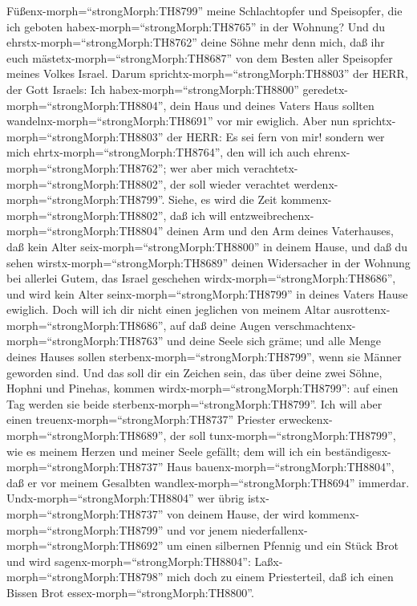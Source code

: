 Füßenx-morph=``strongMorph:TH8799'' meine Schlachtopfer und Speisopfer,
die ich geboten habex-morph=``strongMorph:TH8765'' in der Wohnung? Und
du ehrstx-morph=``strongMorph:TH8762'' deine Söhne mehr denn mich, daß
ihr euch mästetx-morph=``strongMorph:TH8687'' von dem Besten aller
Speisopfer meines Volkes Israel.  Darum
sprichtx-morph=``strongMorph:TH8803'' der HERR, der Gott Israels: Ich
habex-morph=``strongMorph:TH8800''
geredetx-morph=``strongMorph:TH8804'', dein Haus und deines Vaters Haus
sollten wandelnx-morph=``strongMorph:TH8691'' vor mir ewiglich. Aber nun
sprichtx-morph=``strongMorph:TH8803'' der HERR: Es sei fern von mir!
sondern wer mich ehrtx-morph=``strongMorph:TH8764'', den will ich auch
ehrenx-morph=``strongMorph:TH8762''; wer aber mich
verachtetx-morph=``strongMorph:TH8802'', der soll wieder verachtet
werdenx-morph=``strongMorph:TH8799''.  Siehe, es wird die
Zeit kommenx-morph=``strongMorph:TH8802'', daß ich will
entzweibrechenx-morph=``strongMorph:TH8804'' deinen Arm und den Arm
deines Vaterhauses, daß kein Alter seix-morph=``strongMorph:TH8800'' in
deinem Hause,  und daß du sehen
wirstx-morph=``strongMorph:TH8689'' deinen Widersacher in der Wohnung
bei allerlei Gutem, das Israel geschehen
wirdx-morph=``strongMorph:TH8686'', und wird kein Alter
seinx-morph=``strongMorph:TH8799'' in deines Vaters Hause ewiglich.
 Doch will ich dir nicht einen jeglichen von meinem Altar
ausrottenx-morph=``strongMorph:TH8686'', auf daß deine Augen
verschmachtenx-morph=``strongMorph:TH8763'' und deine Seele sich gräme;
und alle Menge deines Hauses sollen
sterbenx-morph=``strongMorph:TH8799'', wenn sie Männer geworden sind.
 Und das soll dir ein Zeichen sein, das über deine zwei
Söhne, Hophni und Pinehas, kommen wirdx-morph=``strongMorph:TH8799'':
auf einen Tag werden sie beide sterbenx-morph=``strongMorph:TH8799''.
 Ich will aber einen treuenx-morph=``strongMorph:TH8737''
Priester erweckenx-morph=``strongMorph:TH8689'', der soll
tunx-morph=``strongMorph:TH8799'', wie es meinem Herzen und meiner Seele
gefällt; dem will ich ein beständigesx-morph=``strongMorph:TH8737'' Haus
bauenx-morph=``strongMorph:TH8804'', daß er vor meinem Gesalbten
wandlex-morph=``strongMorph:TH8694'' immerdar. 
Undx-morph=``strongMorph:TH8804'' wer übrig
istx-morph=``strongMorph:TH8737'' von deinem Hause, der wird
kommenx-morph=``strongMorph:TH8799'' und vor jenem
niederfallenx-morph=``strongMorph:TH8692'' um einen silbernen Pfennig
und ein Stück Brot und wird sagenx-morph=``strongMorph:TH8804'':
Laßx-morph=``strongMorph:TH8798'' mich doch zu einem Priesterteil, daß
ich einen Bissen Brot essex-morph=``strongMorph:TH8800''.

